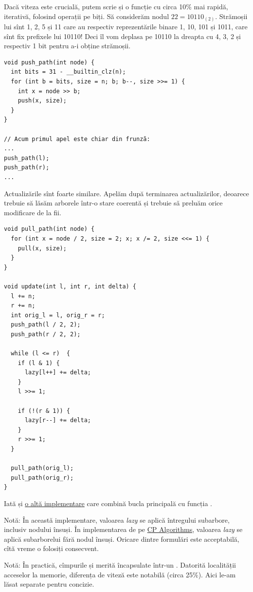 \documentclass[../main.tex]{subfiles}
\begin{document}
Dacă viteza este crucială, putem scrie și o funcție  cu circa 10\% mai rapidă, iterativă, folosind operații pe biți. Să considerăm nodul $22=10110_{(2)}$. Strămoșii lui sînt 1, 2, 5 și 11 care au respectiv reprezentările binare 1, 10, 101 și 1011, care sînt fix prefixele lui 10110! Deci îl vom deplasa pe 10110 la dreapta cu 4, 3, 2 și respectiv 1 bit pentru a-i obține strămoșii.

\begin{verbatim}
void push_path(int node) {
  int bits = 31 - __builtin_clz(n);
  for (int b = bits, size = n; b; b--, size >>= 1) {
    int x = node >> b;
    push(x, size);
  }
}

// Acum primul apel este chiar din frunză:
...
push_path(l);
push_path(r);
...
\end{verbatim}

Actualizările sînt foarte similare. Apelăm  după terminarea actualizărilor, deoarece trebuie să lăsăm arborele într-o stare coerentă și trebuie să preluăm orice modificare de la fii.

\begin{verbatim}
void pull_path(int node) {
  for (int x = node / 2, size = 2; x; x /= 2, size <<= 1) {
    pull(x, size);
  }
}

void update(int l, int r, int delta) {
  l += n;
  r += n;
  int orig_l = l, orig_r = r;
  push_path(l / 2, 2);
  push_path(r / 2, 2);

  while (l <= r)  {
    if (l & 1) {
      lazy[l++] += delta;
    }
    l >>= 1;

    if (!(r & 1)) {
      lazy[r--] += delta;
    }
    r >>= 1;
  }

  pull_path(orig_l);
  pull_path(orig_r);
}
\end{verbatim}

Iată și \href{https://codeforces.com/blog/entry/18051}{o altă implementare} care combină bucla  principală cu funcția .

Notă: În această implementare, valoarea \textit{lazy} se aplică întregului subarbore, inclusiv nodului însuși. În implementarea de pe \href{https://cp-algorithms.com/data_structures/segment_tree.html#adding-on-segments-querying-for-maximum}{CP Algorithms}, valoarea \textit{lazy} se aplică subarborelui fără nodul însuși. Oricare dintre formulări este acceptabilă, cîtă vreme o folosiți consecvent.

Notă: În practică, cîmpurile  și  merită încapsulate într-un . Datorită localității acceselor la memorie, diferența de viteză este notabilă (circa 25\%). Aici le-am lăsat separate pentru concizie.
\end{document}
